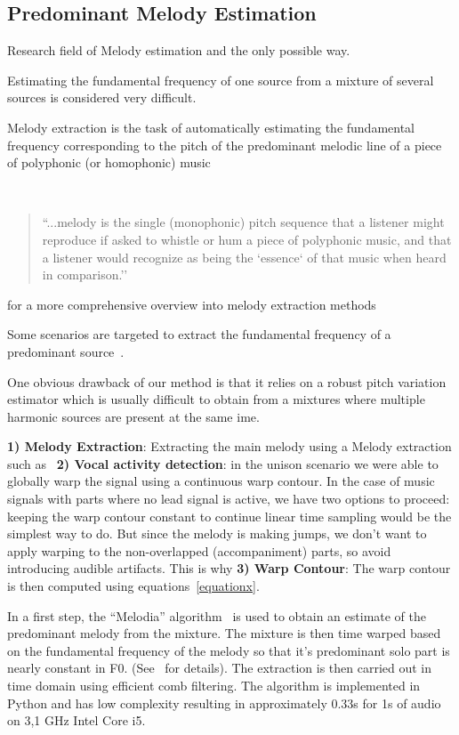 \subsection{Predominant Melody Estimation}

\cite{cano14}

Research field of Melody estimation and the only possible way.

Estimating the fundamental frequency of one source from a mixture of several sources is considered very difficult.

Melody extraction is the task of automatically estimating the fundamental frequency corresponding to the pitch of the predominant melodic line of a piece of polyphonic (or homophonic) music

~\cite{poliner07}

\begin{quote}
  ``...melody is the single (monophonic) pitch sequence that a listener might reproduce if asked to whistle or hum a piece of polyphonic music, and that a listener would recognize as being the `essence` of that music when heard in comparison.''
\end{quote}

for a more comprehensive overview into melody extraction methods

Some scenarios are targeted to extract the fundamental frequency of a predominant source~\cite{salamon12}.

One obvious drawback of our method is that it relies on a robust pitch variation estimator which is usually difficult to obtain from a mixtures where multiple harmonic sources are present at the same ime.

\noindent\textbf{1) Melody Extraction}: Extracting the main melody using a Melody extraction such as~\cite{salamon12}
\textbf{2) Vocal activity detection}: in the unison scenario we were able to globally warp the signal using a continuous warp contour. In the case of music signals with parts where no lead signal is active, we have two options to proceed: keeping the warp contour constant to continue linear time sampling would be the simplest way to do. But since the melody is making jumps, we don't want to apply warping to the non-overlapped (accompaniment) parts, so avoid introducing audible artifacts. This is why 
\textbf{3) Warp Contour}: The warp contour is then computed using equations~\ref{equationx}.

In a first step, the ``Melodia'' algorithm~\cite{salamon12} is used to obtain an estimate of the predominant melody from the mixture. The mixture is then time warped based on the fundamental frequency of the melody so that it’s predominant solo part is nearly constant in F0. (See~\cite{salamon12} for details). The extraction is then carried out in time domain using efficient comb filtering.
The algorithm is implemented in Python and has low complexity resulting in approximately 0.33s for 1s of audio on 3,1 GHz Intel Core i5.

